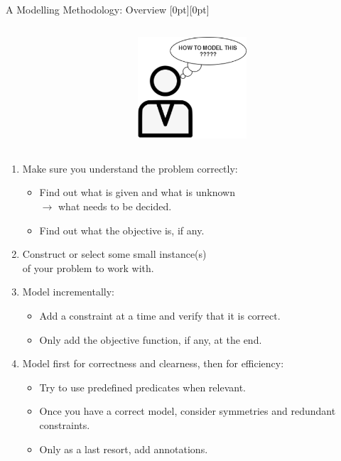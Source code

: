 \documentclass{cons-beamer}
\begin{document}
\begin{frame}{A Modelling Methodology: Overview}
  \raisebox{-\height}[0pt][0pt]{%
    \begin{columns}
      \begin{column}{0.7\textwidth}
          
      \end{column}
      \begin{column}{0.3\textwidth}
        \includegraphics[height=38mm]{images/how_to_model.png}%
      \end{column}
    \end{columns}
  }

  \begin{enumerate}
    \item Make sure you understand the problem correctly:
    \begin{itemize}
      \item Find out what is given and what is unknown \\$\xrightarrow{}$ what needs to be decided.
      \item Find out what the objective is, if any.
    \end{itemize}
    \vfill
    \item Construct or select some small instance(s) \\of your problem to work with.
    \vfill
    \item Model incrementally: 
    \begin{itemize}
      \item Add a constraint at a time and verify that it is correct.
      \item Only add the objective function, if any, at the end.
    \end{itemize}
    \vfill
    \item Model first for correctness and clearness, then for efficiency:
    \begin{itemize}
      \item Try to use predefined predicates when relevant.
      \item Once you have a correct model, consider symmetries and redundant constraints.
      \item Only as a last resort, add annotations.
    \end{itemize}
  \end{enumerate}
\end{frame}
\end{document}
